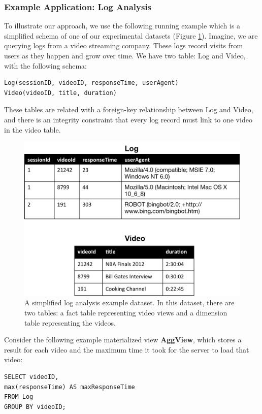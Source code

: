 \subsubsection{Example Application: Log Analysis}
To illustrate our approach, we use the following running example which is a 
simplified schema of one of our experimental datasets (Figure \ref{example}).
Imagine, we are querying logs from a video streaming company. 
These logs record visits from users as they happen and grow over time.
We have two table: Log and Video, with the following schema:
\begin{lstlisting}
Log(sessionID, videoID, responseTime, userAgent)
Video(videoID, title, duration)
\end{lstlisting}
These tables are related with a foreign-key relationship between
Log and Video, and there is an integrity constraint that every log
record must link to one video in the video table.

\begin{figure}[h]
\label{example}
\centering
 \includegraphics[width=\columnwidth]{figs/sample-clean-example.png}
 \caption{A simplified log analysis example dataset. In this dataset, there are two tables: a fact table representing video views and a dimension table representing the videos.}
\end{figure}

Consider the following example materialized view \textbf{AggView}, which stores a result for each video and the maximum time it took for the server to load that video:
\begin{lstlisting} 
SELECT videoID, 
max(responseTime) AS maxResponseTime 
FROM Log 
GROUP BY videoID;
\end{lstlisting}

